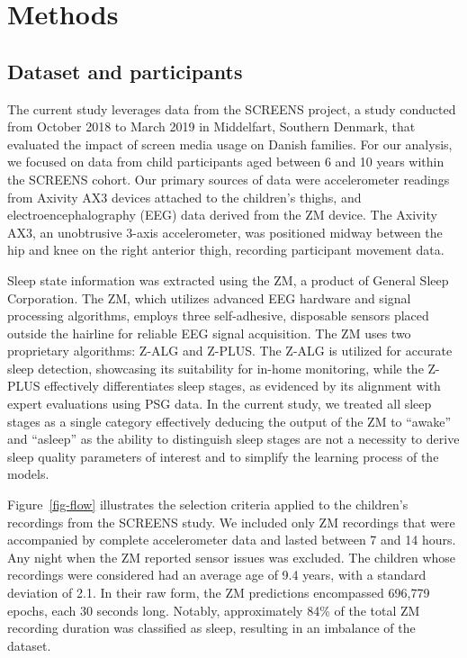 \documentclass[
  super,
  preprint,
  3p]{elsarticle}
\begin{document}
\hypertarget{methods}{%
\section{Methods}\label{methods}}

\hypertarget{dataset-and-participants}{%
\subsection{Dataset and participants}\label{dataset-and-participants}}

The current study leverages data from the SCREENS
project\citep{rasmussen2020}, a study conducted from October 2018 to
March 2019 in Middelfart, Southern Denmark, that evaluated the impact of
screen media usage on Danish families. For our analysis, we focused on
data from child participants aged between 6 and 10 years within the
SCREENS cohort. Our primary sources of data were accelerometer readings
from Axivity AX3 devices attached to the children's thighs, and
electroencephalography (EEG) data derived from the ZM device. The
Axivity AX3, an unobtrusive 3-axis accelerometer, was positioned midway
between the hip and knee on the right anterior thigh, recording
participant movement data.

Sleep state information was extracted using the ZM, a product of General
Sleep Corporation. The ZM, which utilizes advanced EEG hardware and
signal processing algorithms, employs three self-adhesive, disposable
sensors placed outside the hairline for reliable EEG signal acquisition.
The ZM uses two proprietary algorithms: Z-ALG and Z-PLUS. The Z-ALG is
utilized for accurate sleep detection, showcasing its suitability for
in-home monitoring\citep{kaplan2014}, while the Z-PLUS effectively
differentiates sleep stages, as evidenced by its alignment with expert
evaluations using PSG data\citep{wang2015}. In the current study, we
treated all sleep stages as a single category effectively deducing the
output of the ZM to ``awake'' and ``asleep'' as the ability to
distinguish sleep stages are not a necessity to derive sleep quality
parameters of interest and to simplify the learning process of the
models.

Figure~\ref{fig-flow} illustrates the selection criteria applied to the
children's recordings from the SCREENS study. We included only ZM
recordings that were accompanied by complete accelerometer data and
lasted between 7 and 14 hours. Any night when the ZM reported sensor
issues was excluded. The children whose recordings were considered had
an average age of 9.4 years, with a standard deviation of 2.1. In their
raw form, the ZM predictions encompassed 696,779 epochs, each 30 seconds
long. Notably, approximately 84\% of the total ZM recording duration was
classified as sleep, resulting in an imbalance of the dataset.
\end{document}
